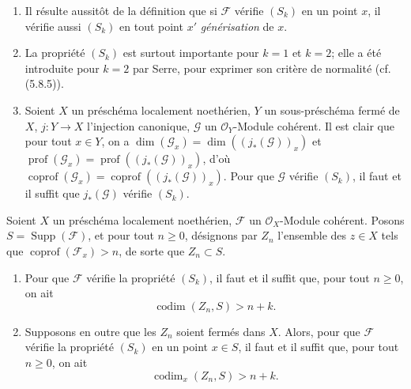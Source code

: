 \begin{remarks}[5.7.3]
\begin{enumerate}
\item[(iv)] Il résulte aussitôt de la définition que si $\mathscr F$ vérifie
$(S_k)$ en un point $x$, il vérifie aussi $(S_k)$ en tout point $x'$
\emph{générisation} de $x$.

\item[(v)] La propriété $(S_k)$ est surtout importante pour $k=1$ et
$k=2$; elle a été introduite pour $k=2$ par Serre, pour exprimer son critère
de normalité (cf. (5.8.5)).

\item[(vi)] Soient $X$ un préschéma localement noethérien, $Y$ un
sous-préschéma fermé de $X$, $j:Y\to X$ l'injection canonique, $\mathscr G$
un $\mathcal O_Y$-Module cohérent. Il est clair que pour tout $x\in Y$, on a
$\dim(\mathscr G_x)=\dim((j_*(\mathscr G))_x)$ et
$\operatorname{prof}(\mathscr G_x)=\operatorname{prof}((j_*(\mathscr G))_x)$,
d'où
$\operatorname{coprof}(\mathscr G_x)=\operatorname{coprof}((j_*(\mathscr G))_x)$.
Pour que $\mathscr G$ vérifie $(S_k)$, il faut et il suffit que
$j_*(\mathscr G)$ vérifie $(S_k)$.
\end{enumerate}
\end{remarks}

\begin{proposition}[5.7.4]
\label{IV.2.s5.7.4-fr}
Soient $X$ un préschéma localement noethérien, $\mathscr F$ un
$\mathcal O_X$-Module cohérent. Posons $S=\operatorname{Supp}(\mathscr F)$,
et pour tout $n\geq0$, désignons par $Z_n$ l'ensemble des $z\in X$ tels que
$\operatorname{coprof}(\mathscr F_x)>n$, de sorte que $Z_n\subset S$.
\begin{enumerate}
\item[\textup{(i)}] Pour que $\mathscr F$ vérifie la propriété $(S_k)$, il faut et il
suffit que, pour tout $n\geq0$, on ait
\begin{equation}
\operatorname{codim}(Z_n,S)>n+k.
\tag{5.7.4.1}\label{IV.2.s5.7.4.1-fr}
\end{equation}
\item[\textup{(ii)}] Supposons en outre que les $Z_n$ soient fermés dans $X$. Alors,
pour que $\mathscr F$ vérifie la propriété $(S_k)$ en un point $x\in S$, il
faut et il suffit que, pour tout $n\geq0$, on ait
\begin{equation}
\operatorname{codim}_x(Z_n,S)>n+k.
\tag{5.7.4.2}\label{IV.2.s5.7.4.2-fr}
\end{equation}
\end{enumerate}
\end{proposition}

